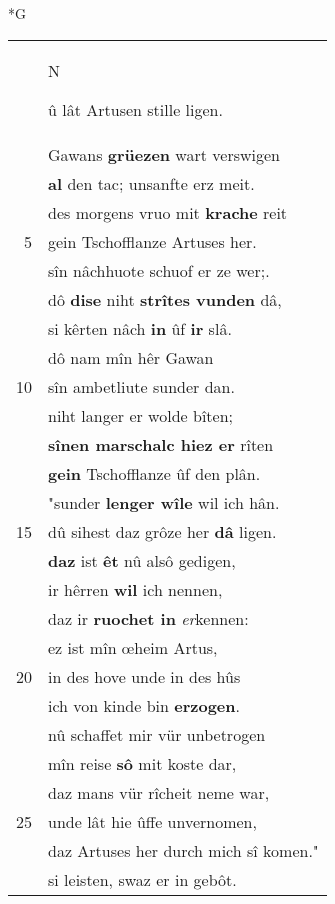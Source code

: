 \documentclass[8pt,a4paper,notitlepage]{article}
\begin{document}
\begin{table}[ht]
\begin{minipage}[t]{0.5\linewidth}
\small
\begin{center}*G
\end{center}
\begin{tabular}{rl}
 & \begin{large}N\end{large}û lât Artusen stille ligen.\\ 
 & Gawans \textbf{grüezen} wart verswigen\\ 
 & \textbf{al} den tac; unsanfte erz meit.\\ 
 & des morgens vruo mit \textbf{krache} reit\\ 
5 & gein Tschofflanze Artuses her.\\ 
 & sîn nâchhuote schuof er ze wer;.\\ 
 & dô \textbf{dise} niht \textbf{strîtes vunden} dâ,\\ 
 & si kêrten nâch \textbf{in} ûf \textbf{ir} slâ.\\ 
 & dô nam mîn hêr Gawan\\ 
10 & sîn ambetliute sunder dan.\\ 
 & niht langer er wolde bîten;\\ 
 & \textbf{sînen marschalc hiez er} rîten\\ 
 & \textbf{gein} Tschofflanze ûf den plân.\\ 
 & "sunder \textbf{lenger wîle} wil ich hân.\\ 
15 & dû sihest daz grôze her \textbf{dâ} ligen.\\ 
 & \textbf{daz} ist \textbf{êt} nû alsô gedigen,\\ 
 & ir hêrren \textbf{wil} ich nennen,\\ 
 & daz ir \textbf{ruochet in} \textit{er}kennen:\\ 
 & ez ist mîn œheim Artus,\\ 
20 & in des hove unde in des hûs\\ 
 & ich von kinde bin \textbf{erzogen}.\\ 
 & nû schaffet mir vür unbetrogen\\ 
 & mîn reise \textbf{sô} mit koste dar,\\ 
 & daz mans vür rîcheit neme war,\\ 
25 & unde lât hie ûffe unvernomen,\\ 
 & daz Artuses her durch mich sî komen."\\ 
 & si leisten, swaz er in gebôt.\\ 

\end{tabular}
\end{minipage}
\end{table}
\end{document}

